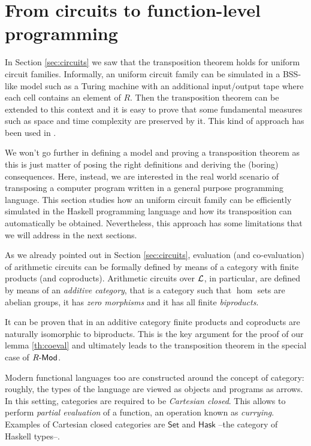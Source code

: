\section{From circuits to function-level programming}
\label{sec:fp}
\lstset{language=haskell}

In Section \ref{sec:circuits} we saw that the transposition theorem
holds for uniform circuit families.  Informally, an uniform circuit
family can be simulated in a BSS-like model \cite{BSS} such as a
Turing machine with an additional input/output tape where each cell
contains an element of $R$. Then the transposition theorem can be
extended to this context and it is easy to prove that some fundamental
measures such as space and time complexity are preserved by it. This
kind of approach has been used in \cite{BoLeSc03}.

We won't go further in defining a model and proving a transposition
theorem as this is just matter of posing the right definitions and
deriving the (boring) consequences. Here, instead, we are interested
in the real world scenario of transposing a computer program written
in a general purpose programming language. This section studies how an
uniform circuit family can be efficiently simulated in the Haskell
programming language and how its transposition can automatically be
obtained. Nevertheless, this approach has some limitations that we
will address in the next sections.

As we already pointed out in Section \ref{sec:circuits}, evaluation
(and co-evaluation) of arithmetic circuits can be formally defined by
means of a category with finite products (and coproducts). Arithmetic
circuits over $\mathcal{L}$, in particular, are defined by means of an
\emph{additive category}, that is a category such that $\hom$ sets are
abelian groups, it has \emph{zero morphisms} and it has all finite
\emph{biproducts}.

It can be proven \cite[VIII.2]{McLane} that in an additive category
finite products and coproducts are naturally isomorphic to biproducts.
This is the key argument for the proof of our lemma \ref{th:coeval}
and ultimately leads to the transposition theorem in the special case
of $R\text{\sf-Mod}$.

Modern functional languages too are constructed around the concept of
category: roughly, the types of the language are viewed as objects and
programs as arrows. In this setting, categories are required to be
\emph{Cartesian closed}. This allows to perform \emph{partial
  evaluation} of a function, an operation known as
\emph{currying}. Examples of Cartesian closed categories are
$\mathsf{Set}$ and $\mathsf{Hask}$ --the category of Haskell types--.

